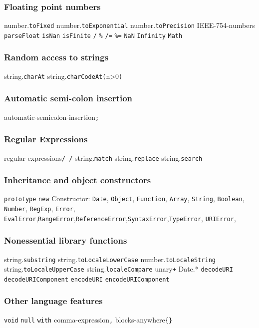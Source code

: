 \subsubsection{Floating point numbers}
number.\verb|toFixed|
number.\verb|toExponential|
number.\verb|toPrecision|
IEEE-754-numbers
\verb|parseFloat|
\verb|isNan|
\verb|isFinite|
\verb|/|
\verb|%|
\verb|/=|
\verb|%=|
\verb|NaN| \verb|Infinity|
\verb|Math|

\subsubsection{Random access to strings}
string.\verb|charAt|
string.\verb|charCodeAt(|n>0\verb|)|

\subsubsection{Automatic semi-colon insertion}
automatic-semicolon-insertion\verb|;|

\subsubsection{Regular Expressions}
regular-expressions\verb|/ /|
string.\verb|match|
string.\verb|replace|
string.\verb|search|

\subsubsection{Inheritance and object constructors}
\verb|prototype|
\verb|new|
Constructor: \verb|Date|, \verb|Object|, \verb|Function|, \verb|Array|, \verb|String|, \verb|Boolean|, \verb|Number|, \verb|RegExp|, \verb|Error|, \verb|EvalError|,\verb|RangeError|,\verb|ReferenceError|,\verb|SyntaxError|,\verb|TypeError|, \verb|URIError|,

\subsubsection{Nonessential library functions}
string.\verb|substring|
string.\verb|toLocaleLowerCase|
number.\verb|toLocaleString|
string.\verb|toLocaleUpperCase|
string.\verb|localeCompare|
unary\verb|+|
Date.*
\verb|decodeURI|
\verb|decodeURIComponent|
\verb|encodeURI|
\verb|encodeURIComponent|

\subsubsection{Other language features}
\verb|void|
\verb|null|
\verb|with|
comma-expression\verb|,|
blocks-anywhere\verb|{}|

